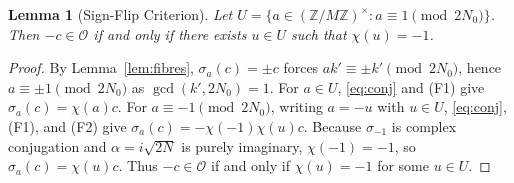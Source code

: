 \documentclass[11pt]{article}
\newtheorem{lemma}[theorem]{Lemma}
\begin{document}
\begin{lemma}[Sign-Flip Criterion]\label{lem:sign}
Let $U = \{a \in (\mathbb{Z}/M\mathbb{Z})^\times : a \equiv 1 \pmod{2N_0}\}$. Then $-c \in \mathcal{O}$ if and only if there exists $u \in U$ such that $\chi(u) = -1$.
\end{lemma}

\begin{proof}
By Lemma~\ref{lem:fibres}, $\sigma_a(c) = \pm c$ forces $a k' \equiv \pm k' \pmod{2N_0}$, hence $a \equiv \pm 1 \pmod{2N_0}$ as $\gcd(k', 2N_0) = 1$. For $a \in U$, \eqref{eq:conj} and (F1) give $\sigma_a(c) = \chi(a)c$. For $a \equiv -1 \pmod{2N_0}$, writing $a = -u$ with $u \in U$, \eqref{eq:conj}, (F1), and (F2) give $\sigma_a(c) = -\chi(-1)\chi(u)c$. Because $\sigma_{-1}$ is complex conjugation and $\alpha = i\sqrt{2N}$ is purely imaginary, $\chi(-1) = -1$, so $\sigma_a(c) = \chi(u)c$. Thus $-c \in \mathcal{O}$ if and only if $\chi(u) = -1$ for some $u \in U$.
\end{proof}
\end{document}

